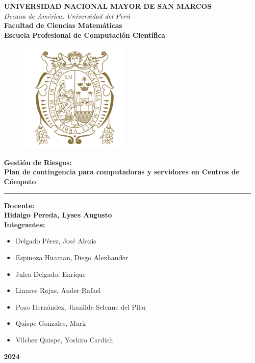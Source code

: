 \thispagestyle{empty}
{\begin{titlepage}
\begin{center}
{\fontsize{16}{15} \textbf{UNIVERSIDAD NACIONAL MAYOR DE SAN MARCOS}}\\
\vspace{2.5mm}
{\fontsize{14}{10} \textit{Decana de América, Universidad del Perú}}\\
\vspace{2.5 mm}
{\fontsize{14}{10} \textbf{Facultad de Ciencias Matemáticas}}\\
\vspace{2.5mm}
{\fontsize{14}{10} \textbf{Escuela Profesional de Computación Científica}}\\
\vspace{2.5mm}
\begin{figure}[H]
    \centering
    \includegraphics[height=5.5cm]{include/logo.png}
\end{figure}
{\fontsize{14}{10} \textbf{Gestión de Riesgos:\\Plan de contingencia para computadoras y servidores en Centros de Cómputo}}
\rule{\linewidth}{0.55mm}
{\large\textbf{Docente:\\Hidalgo Pereda, Lyses Augusto}}\\
\vspace{8mm}
{\large\textbf{Integrantes:}}
\begin{itemize}
    \item Delgado Pérez, José Alexis
    \item Espinoza Huaman, Diego Alexhander 
    \item Julca Delgado, Enrique
    \item Linares Rojas, Ander Rafael
    \item Pozo Hernández, Jhanilde Selenne del Pilar
    \item Quispe Gonzales, Mark
    \item Vilchez Quispe, Yoshiro Cardich 

\end{itemize}
\vspace{15mm}
{\huge\textbf{2024}}
\end{center}
\end{titlepage}
}